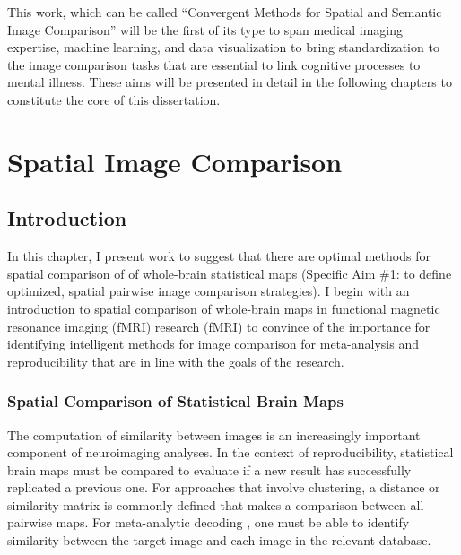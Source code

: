 \documentclass{report}
\begin{document}
This work, which can be called ``Convergent Methods for Spatial and Semantic Image Comparison'' will be the first of its type to span
medical imaging expertise, machine learning, and data visualization to bring standardization to the image comparison tasks that are essential to link cognitive processes to mental illness. These aims will be presented in detail in
the following chapters to constitute the core of this dissertation.

\chapter{Spatial Image Comparison}

\section{Introduction}

In this chapter, I present work
 \cite{Sochat2015-qs} to suggest that there are optimal methods for spatial comparison of of whole-brain statistical maps (Specific Aim \#1: to define optimized, spatial pairwise image comparison strategies). I begin with an introduction to spatial comparison of whole-brain maps in
functional magnetic resonance imaging (fMRI) research (fMRI) to convince
of the importance for identifying intelligent methods for image
comparison for meta-analysis and reproducibility that are in line with
the goals of the research.

\subsection{Spatial Comparison of Statistical Brain Maps}
The computation of similarity between images is an increasingly
important component of neuroimaging analyses. In the context of
reproducibility, statistical brain maps must be compared to evaluate if
a new result has successfully replicated a previous one. For approaches
that involve clustering, a distance or similarity matrix is commonly
defined that makes a comparison between all pairwise maps. For
meta-analytic decoding \cite{Yarkoni2011-rg}, one must be able to identify similarity between the target image and
each image in the relevant database.
\end{document}
